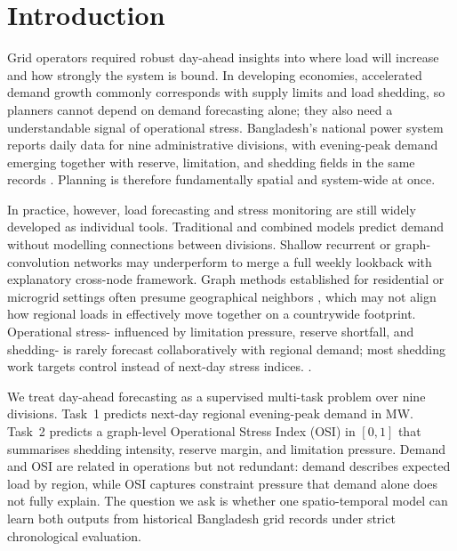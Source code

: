 \section{Introduction}\label{sec:introduction}

Grid operators required robust day-ahead insights into where load will increase and how strongly the system is bound. In developing economies, accelerated demand growth commonly corresponds with supply limits and load shedding, so planners cannot depend on demand forecasting alone; they also need a understandable signal of operational stress. Bangladesh’s national power system reports daily data for nine administrative divisions, with evening-peak demand emerging together with reserve, limitation, and shedding fields in the same records \cite{Hossain2025BangladeshSmartGrid}. Planning is therefore fundamentally spatial and system-wide at once.

In practice, however, load forecasting and stress monitoring are still widely developed as individual tools. Traditional and combined models \cite{Breiman2001RandomForest,Chen2016XGBoost,Musbah2025LoadForecasting} predict demand without modelling connections between divisions. Shallow recurrent or graph-convolution networks \cite{Hochreiter1997LSTM,Zhao2020TGCN} may underperform to merge a full weekly lookback with explanatory cross-node framework. Graph methods established for residential or microgrid settings often presume geographical neighbors \cite{Kipf2017GCN}, which may not align how regional loads in effectively move together on a countrywide footprint. Operational stress- influenced by limitation pressure, reserve shortfall, and shedding- is rarely forecast collaboratively with regional demand; most shedding work \cite{Paphitis2025SpatialLoadShedding} targets control instead of next-day stress indices.  \cite{Baur2024XAIReview,Lundberg2017SHAP}.

We treat day-ahead forecasting as a supervised multi-task problem \cite{Caruana1997Multitask} over nine divisions. Task~1 predicts next-day regional evening-peak demand in MW. Task~2 predicts a graph-level Operational Stress Index (OSI) in $[0,1]$ that summarises shedding intensity, reserve margin, and limitation pressure. Demand and OSI are related in operations but not redundant: demand describes expected load by region, while OSI captures constraint pressure that demand alone does not fully explain. The question we ask is whether one spatio-temporal model can learn both outputs from historical Bangladesh grid records under strict chronological evaluation.


